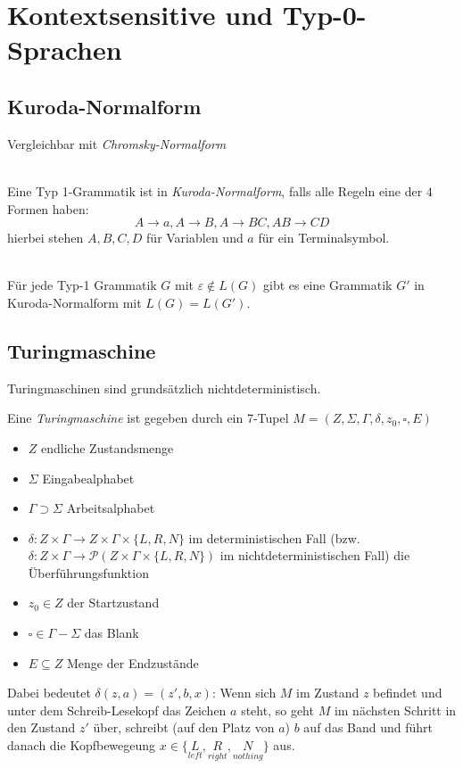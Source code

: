 \documentclass{scrartcl}
\begin{document}
\section*{Kontextsensitive und Typ-0-Sprachen}
\subsection*{Kuroda-Normalform}
{\tiny Vergleichbar mit \emph{Chromsky-Normalform}}
\begin{shaded}
    \ \\
    Eine Typ 1-Grammatik ist in \emph{Kuroda-Normalform}, falls alle Regeln eine der $4$ Formen haben: \[ A\to a, A\to B, A\to BC, AB\to CD \]
    hierbei stehen $A,B,C,D$ für Variablen und $a$ für ein Terminalsymbol.
\end{shaded}
\begin{shaded}
    \ \\Für jede Typ-1 Grammatik $G$ mit $\varepsilon \not\in L(G)$ gibt es eine Grammatik $G'$ in Kuroda-Normalform mit $L(G) = L(G')$.
\end{shaded}

\subsection*{Turingmaschine}
{\tiny Turingmaschinen sind grundsätzlich nichtdeterministisch.}
\begin{shaded}
    Eine \emph{Turingmaschine} ist gegeben durch ein 7-Tupel $M=(Z,\Sigma,\Gamma,\delta,z_0,\square,E)$
    \begin{minipage}[t]{0.48\textwidth}
    \begin{itemize}
        \item $Z$ endliche Zustandsmenge
        \item $\Sigma$ Eingabealphabet
        \item $\Gamma\supset\Sigma$ Arbeitsalphabet
        \item $\delta:Z\times\Gamma\to Z\times\Gamma\times\{L,R,N\}$ im deterministischen Fall (bzw. $\delta:Z\times\Gamma\to\mathcal{P}(Z\times\Gamma\times\{L,R,N\})$ im nichtdeterministischen Fall) die Überführungsfunktion
    \end{itemize}
    \end{minipage}
    \hfill \vrule \hfill
    \begin{minipage}[t]{0.48\textwidth}
    \begin{itemize}
        \item $z_0\in Z$ der Startzustand
        \item $\square\in\Gamma-\Sigma$ das Blank
        \item $E\subseteq Z$ Menge der Endzustände
    \end{itemize}
    \end{minipage}
\end{shaded}
Dabei bedeutet $\delta(z,a)=(z',b,x)$: Wenn sich $M$ im Zustand $z$ befindet und unter dem Schreib-Lesekopf das Zeichen $a$ steht, so geht $M$ im nächsten Schritt in den Zustand $z'$ über, schreibt (auf den Platz von $a$) $b$ auf das Band und führt danach die Kopfbewegeung $x\in\{\underset{left}{L},\underset{right}{R},\underset{nothing}{N}\}$ aus.
\end{document}
